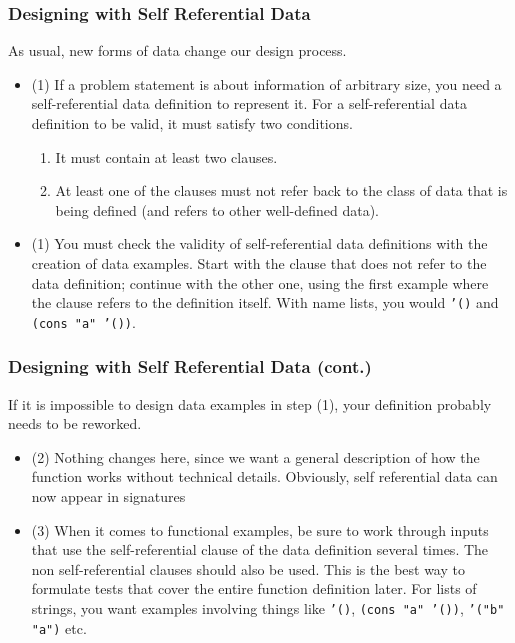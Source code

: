 \documentclass{beamer}
\begin{document}
\begin{frame}
  \frametitle{Designing with Self Referential Data}
  As usual, new forms of data change our design process.
  \begin{itemize}
  \item<2-> (1) If a problem statement is about information of arbitrary size, you need a self-referential data definition to represent it. For a self-referential data definition to be valid, it must satisfy two conditions.
    \begin{enumerate}
    \item<3-> It must contain at least two clauses.
    \item<4-> At least one of the clauses must not refer back to the class of data that is being defined (and refers to other well-defined data).
    \end{enumerate}
  \item<5-> (1) You must check the validity of self-referential data definitions with the creation of data examples. Start with the clause that does not refer to the data definition; continue with the other one, using the first example where the clause refers to the definition itself.  With name lists, you would \texttt{'()} and
    \texttt{(cons "a" '())}.
  \end{itemize}
\end{frame}

\begin{frame}
  \frametitle{Designing with Self Referential Data (cont.)}
  If it is impossible to design data examples in step (1), your definition probably needs to be reworked.
  \begin{itemize}
  \item<2-> (2) Nothing changes here, since we want a general description of how the function works without technical details. Obviously, self referential data can now appear in signatures
  \item<3-> (3) When it comes to functional examples, be sure to work through inputs that use the self-referential clause of the data definition several times. The non self-referential clauses should also be used. This is the best way to formulate tests that cover the entire function definition later. For lists of strings, you want examples involving things like \texttt{'()}, \texttt{(cons "a" '())}, \texttt{'("b" "a")} etc. 
  \end{itemize}
\end{frame}
\end{document}
